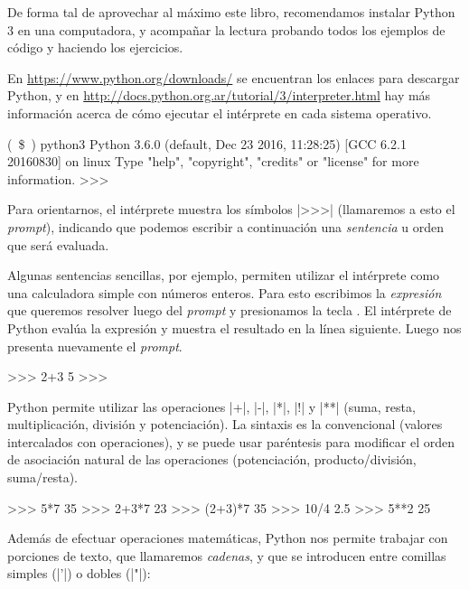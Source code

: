\begin{atencion}
De forma tal de aprovechar al máximo este libro, recomendamos instalar Python 3
en una computadora, y acompañar la lectura probando todos los ejemplos de
código y haciendo los ejercicios.

En \url{https://www.python.org/downloads/} se encuentran los enlaces para
descargar Python, y en
\url{http://docs.python.org.ar/tutorial/3/interpreter.html} hay más información
acerca de cómo ejecutar el intérprete en cada sistema operativo.
\end{atencion}

\begin{codigo-nohl-sn}
(~\$~) python3
Python 3.6.0 (default, Dec 23 2016, 11:28:25)
[GCC 6.2.1 20160830] on linux
Type "help", "copyright", "credits" or "license" for more information.
>>>
\end{codigo-nohl-sn}

Para orientarnos, el intérprete muestra los símbolos |>>>| (llamaremos a esto
el \emph{prompt}), indicando que podemos escribir a continuación una
\emph{sentencia} u orden que será evaluada.

Algunas sentencias sencillas, por ejemplo, permiten utilizar el intérprete como
una calculadora simple con números enteros. Para esto escribimos la
\emph{expresión} que queremos resolver luego del \emph{prompt} y presionamos la tecla
. El intérprete de Python evalúa la expresión y muestra el
resultado en la línea siguiente. Luego nos presenta nuevamente el \emph{prompt}.

\begin{codigo-python-sn}
>>> 2+3
5
>>>
\end{codigo-python-sn}

Python permite utilizar las operaciones |+|, |-|, |*|, |!| y |**|
(suma, resta, multiplicación, división y potenciación). La sintaxis es la
convencional (valores intercalados con operaciones), y se puede usar
paréntesis para modificar el orden de asociación natural de las operaciones
(potenciación, producto/división, suma/resta).

\begin{codigo-python-sn}
>>> 5*7
35
>>> 2+3*7
23
>>> (2+3)*7
35
>>> 10/4
2.5
>>> 5**2
25
\end{codigo-python-sn}

Además de efectuar operaciones matemáticas, Python nos permite trabajar con
porciones de texto, que llamaremos \emph{cadenas}, y que se introducen entre
comillas simples (|'|) o dobles (|"|):

